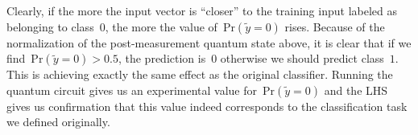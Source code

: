 \documentclass{article}
\DeclarePairedDelimiter\ket{\lvert}{\rangle}
\begin{document}
\noindent Clearly, if the more the input vector is ``closer'' to the training input labeled as belonging to class~0, the more the value of~$\text{Pr}(\tilde{y} = 0)$ rises.  Because of the normalization of the post-measurement quantum state above, it is clear that if we find~$\text{Pr}(\tilde{y} = 0) > 0.5$, the prediction is~$0$ otherwise we should predict class~$1$.  This is achieving exactly the same effect as the original classifier.  Running the quantum circuit gives us an experimental value for~$\text{Pr}(\tilde{y} = 0)$ and the LHS gives us confirmation that this value indeed corresponds to the classification task we defined originally.






\end{document}
